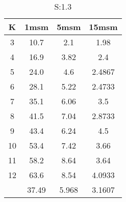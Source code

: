 \begin{table}[H]
\centering
\begin{tabular}{c|ccc}
K &1msm &5msm &15msm\\
\hline
3 & 10.7 & 2.1 & 1.98\\
4 & 16.9 & 3.82 & 2.4\\
5 & 24.0 & 4.6 & 2.4867\\
6 & 28.1 & 5.22 & 2.4733\\
7 & 35.1 & 6.06 & 3.5\\
8 & 41.5 & 7.04 & 2.8733\\
9 & 43.4 & 6.24 & 4.5\\
10 & 53.4 & 7.42 & 3.66\\
11 & 58.2 & 8.64 & 3.64\\
12 & 63.6 & 8.54 & 4.0933\\
\hline
& 37.49 & 5.968 & 3.1607\\
\end{tabular}
\caption{S:1.3}
\label{tab:s1.3}
\end{table}
